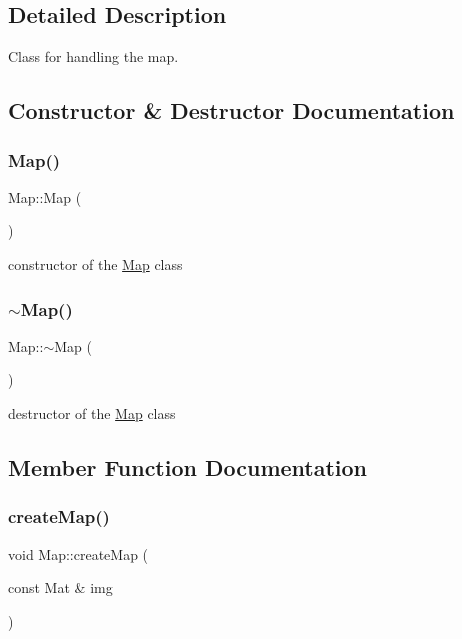 \subsection{Detailed Description}
Class for handling the map. 

\subsection{Constructor \& Destructor Documentation}
\mbox{\label{class_map_a0f5ad0fd4563497b4214038cbca8b582}} 
\subsubsection{\texorpdfstring{Map()}{Map()}}
{\footnotesize\ttfamily Map\+::\+Map (\begin{DoxyParamCaption}{ }\end{DoxyParamCaption})}

constructor of the \mbox{\hyperlink{class_map}{Map}} class \mbox{\label{class_map_aa403fbe09394ccf39747588f5168e3b2}} 
\subsubsection{\texorpdfstring{$\sim$\+Map()}{~Map()}}
{\footnotesize\ttfamily Map\+::$\sim$\+Map (\begin{DoxyParamCaption}{ }\end{DoxyParamCaption})}

destructor of the \mbox{\hyperlink{class_map}{Map}} class 

\subsection{Member Function Documentation}
\mbox{\label{class_map_a02537656e91e97077dfdfc5d84c3027b}} 
\subsubsection{\texorpdfstring{create\+Map()}{createMap()}}
{\footnotesize\ttfamily void Map\+::create\+Map (\begin{DoxyParamCaption}\item[{const Mat \&}]{img }\end{DoxyParamCaption})}


